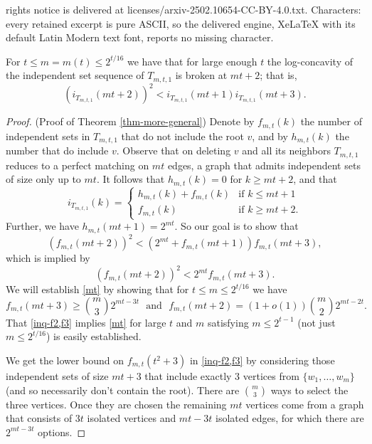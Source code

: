\documentclass[10pt,a4paper]{amsart}
\begin{document}
rights notice is delivered at licenses/arxiv-2502.10654-CC-BY-4.0.txt. Characters: every retained excerpt is pure ASCII, so the delivered engine, XeLaTeX with its default Latin Modern text font, reports no missing character.
\begin{thm} \label{thm-more-general}
For $t \leq m = m(t) \leq 2^{t/16}$ we have that for large enough $t$ the log-concavity of the independent set sequence of $T_{m,t,1}$ is broken at $mt+2$; that is,
$$
\left(i_{T_{m,t,1}}(mt+2)\right)^2 < i_{T_{m,t,1}}(mt+1)i_{T_{m,t,1}}(mt+3). 
$$
\end{thm}

\begin{proof} (Proof of Theorem \ref{thm-more-general})
Denote by $f_{m,t}(k)$ the number of independent sets in $T_{m,t,1}$ that do not include the root $v$, and by $h_{m,t}(k)$ the number that do include $v$. Observe that on deleting $v$ and all its neighbors $T_{m,t,1}$ reduces to a perfect matching on $mt$ edges, a graph that admits independent sets of size only up to $mt$. It follows that $h_{m,t}(k)=0$ for $k \geq mt+2$, and that 
\begin{equation} \label{split}
i_{T_{m,t,1}}(k) = \left\{
\begin{array}{rl}
h_{m,t}(k) + f_{m,t}(k) & \mbox{if $k \leq mt+1$} \\
f_{m,t}(k) & \mbox{if $k \geq mt+2$}.
\end{array}
\right.
\end{equation}
Further, we have $h_{m,t}(mt+1)=2^{mt}$. So our goal is to show that
$$
\left(f_{m,t}(mt+2)\right)^2 < (2^{mt} + f_{m,t}(mt+1))f_{m,t}(mt+3),
$$
which is implied by 
\begin{equation} \label{mt}
\left(f_{m,t}(mt+2)\right)^2 < 2^{mt}f_{m,t}(mt+3).
\end{equation}
We will establish \eqref{mt} by showing that for $t \leq m \leq 2^{t/16}$ we have
\begin{equation} \label{inq-f2,f3}
f_{m,t}(mt+3) \geq \binom{m}{3}2^{mt-3t}~~~\mbox{and}~~~f_{m,t}(mt+2) = \left(1+o(1)\right) \binom{m}{2}2^{mt-2t}.
\end{equation}
That \eqref{inq-f2,f3} implies \eqref{mt} for large $t$ and $m$  satisfying $m \leq 2^{t-1}$ (not just $m \leq 2^{t/16}$) is easily established.  

\smallskip

We get the lower bound on $f_{m,t}(t^2+3)$ in \eqref{inq-f2,f3} by considering those independent sets of size $mt+3$ that include exactly $3$ vertices from $\{w_1, \ldots, w_m\}$ (and so necessarily don't contain the root). There are $\binom{m}{3}$ ways to select the three vertices. Once they are chosen the remaining $mt$ vertices come from a graph that consists of $3t$ isolated vertices and $mt-3t$ isolated edges, for which there are $2^{mt-3t}$ options.


\end{proof}
\end{document}
